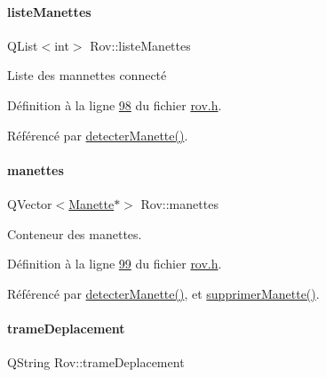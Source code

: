 \mbox{\label{class_rov_ac3bf6c7552073bd2d780e005205919a9}} 
\paragraph{\texorpdfstring{liste\+Manettes}{listeManettes}}
{\footnotesize\ttfamily Q\+List$<$int$>$ Rov\+::liste\+Manettes\hspace{0.3cm}{\ttfamily [private]}}



Liste des mannettes connecté 



Définition à la ligne \hyperlink{rov_8h_source_l00098}{98} du fichier \hyperlink{rov_8h_source}{rov.\+h}.



Référencé par \hyperlink{rov_8cpp_source_l00029}{detecter\+Manette()}.

\mbox{\label{class_rov_a58ea20dc3615a732b87ac381bf1c0a83}} 
\paragraph{\texorpdfstring{manettes}{manettes}}
{\footnotesize\ttfamily Q\+Vector$<$\hyperlink{class_manette}{Manette}$\ast$$>$ Rov\+::manettes\hspace{0.3cm}{\ttfamily [private]}}



Conteneur des manettes. 



Définition à la ligne \hyperlink{rov_8h_source_l00099}{99} du fichier \hyperlink{rov_8h_source}{rov.\+h}.



Référencé par \hyperlink{rov_8cpp_source_l00029}{detecter\+Manette()}, et \hyperlink{rov_8cpp_source_l00117}{supprimer\+Manette()}.

\mbox{\label{class_rov_ad30a06154c31cdb02eb28a0c7197731f}} 
\paragraph{\texorpdfstring{trame\+Deplacement}{trameDeplacement}}
{\footnotesize\ttfamily Q\+String Rov\+::trame\+Deplacement\hspace{0.3cm}{\ttfamily [private]}}



